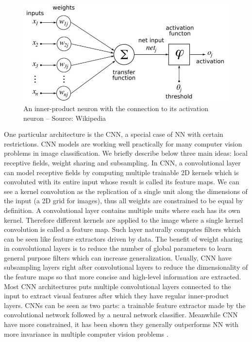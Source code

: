 \documentclass[a4paper,12pt]{report}
\begin{document}
\begin{figure}[h]
    \begin{center}
        \includegraphics{thesis_figures/800px-ArtificialNeuronModel_english.jpg}
    \end{center}
    \caption{An inner-product neuron with the connection to its activation neuron -- Source: Wikipedia}
    \label{fig:artificial_neurons}
\end{figure}

One particular architecture is the CNN, a special case of NN with certain restrictions.
CNN models are working well practically for many computer vision problems in image classification.
We briefly describe below three main ideas: local receptive fields, weight sharing and subsampling.
In CNN, a convolutional layer can model receptive fields by computing multiple trainable 2D kernels which is convoluted with its entire input whose result is called its feature maps.
We can see a kernel convolution as the replication of a single unit along the dimensions of the input (a 2D grid for images), thus all weights are constrained to be equal by definition.
A convolutional layer contains multiple units where each has its own kernel.
Therefore different kernels are applied to the image where a single kernel convolution is called a feature map.
Such layer naturally computes filters which can be seen like feature extractors driven by data.
The benefit of weight sharing in convolutional layers is to reduce the number of global parameters to learn general purpose filters which can increase generalization.
Usually, CNN have subsampling layers right after convolutional layers to reduce the dimensionality of the feature maps so that more concise and high-level information are extracted.
Most CNN architectures puts multiple convolutional layers connected to the input to extract visual features after which they have regular inner-product layers.
CNNs can be seen as two parts: a trainable feature extractor made by the convolutional network followed by a neural network classifier.
Meanwhile CNN have more constrained, it has been shown they generally outperforms NN with more invariance in multiple computer vision problems \cite{simard2003best}\cite{mnist_web}\cite{lawrence1997face}\cite{krizhevsky2012imagenet}.
\end{document}
